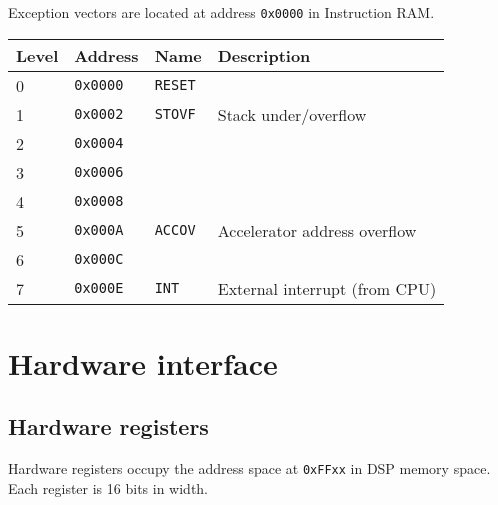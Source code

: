 \documentclass[oneside,english,a4paper,10pt,oneside,openany,final]{memoir}
\newcommand{\Address}[1]{\texttt{#1}}
\begin{document}
Exception vectors are located at address \Address{0x0000} in Instruction RAM.

\begin{table}[htb]
\centering
\begin{tabular}{|l|l|l|l|}
\hline
\textbf{Level} & \textbf{Address} & \textbf{Name}  & \textbf{Description}          \\ \hline
0              & \Address{0x0000} & \texttt{RESET} &                               \\ \hline
1              & \Address{0x0002} & \texttt{STOVF} & Stack under/overflow          \\ \hline
2              & \Address{0x0004} &                &                               \\ \hline
3              & \Address{0x0006} &                &                               \\ \hline
4              & \Address{0x0008} &                &                               \\ \hline
5              & \Address{0x000A} & \texttt{ACCOV} & Accelerator address overflow  \\ \hline
6              & \Address{0x000C} &                &                               \\ \hline
7              & \Address{0x000E} & \texttt{INT}   & External interrupt (from CPU) \\ \hline
\end{tabular}
\end{table}

\pagebreak{}

\chapter{Hardware interface}

\section{Hardware registers}

Hardware registers occupy the address space at \Address{0xFFxx} in DSP memory space. Each register is 16 bits in width.
\end{document}
